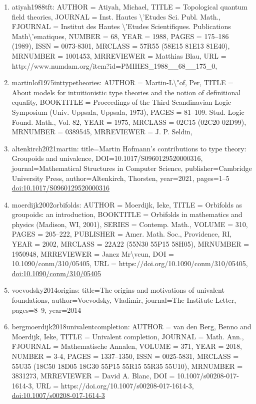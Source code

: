 \documentclass[11pt]{article}
\begin{document}
\begin{enumerate}[leftmargin=*]
  \item atiyah1988tft: AUTHOR = Atiyah, Michael, TITLE = Topological quantum field theories, JOURNAL = Inst. Hautes \textbackslash{}'Etudes Sci. Publ. Math., FJOURNAL = Institut des Hautes \textbackslash{}'Etudes Scientifiques. Publications Math\textbackslash{}'ematiques, NUMBER = 68, YEAR = 1988, PAGES = 175--186 (1989), ISSN = 0073-8301, MRCLASS = 57R55 (58E15 81E13 81E40), MRNUMBER = 1001453, MRREVIEWER = Matthias Blau, URL = http://www.numdam.org/item?id=PMIHES\_1988\_\_68\_\_175\_0,
  \item martinlof1975inttypetheories: AUTHOR = Martin-L\textbackslash{}"of, Per, TITLE = About models for intuitionistic type theories and the notion of definitional equality, BOOKTITLE = Proceedings of the Third Scandinavian Logic Symposium (Univ. Uppsala, Uppsala, 1973), PAGES = 81--109. Stud. Logic Found. Math., Vol. 82, YEAR = 1975, MRCLASS = 02C15 (02C20 02D99), MRNUMBER = 0389545, MRREVIEWER = J. P. Seldin,
  \item altenkirch2021martin: title=Martin Hofmann’s contributions to type theory: Groupoids and univalence, DOI=10.1017/S0960129520000316, journal=Mathematical Structures in Computer Science, publisher=Cambridge University Press, author=Altenkirch, Thorsten, year=2021, pages=1--5 \href{https://doi.org/10.1017/S0960129520000316}{doi:10.1017/S0960129520000316}
  \item moerdijk2002orbifolds: AUTHOR = Moerdijk, Ieke, TITLE = Orbifolds as groupoids: an introduction, BOOKTITLE = Orbifolds in mathematics and physics (Madison, WI, 2001), SERIES = Contemp. Math., VOLUME = 310, PAGES = 205--222, PUBLISHER = Amer. Math. Soc., Providence, RI, YEAR = 2002, MRCLASS = 22A22 (55N30 55P15 58H05), MRNUMBER = 1950948, MRREVIEWER = Janez Mr\textbackslash{}vcun, DOI = 10.1090/conm/310/05405, URL = https://doi.org/10.1090/conm/310/05405, \href{https://doi.org/10.1090/conm/310/05405}{doi:10.1090/conm/310/05405}
  \item voevodsky2014origins: title=The origins and motivations of univalent foundations, author=Voevodsky, Vladimir, journal=The Institute Letter, pages=8--9, year=2014
  \item bergmoerdijk2018univalentcompletion: AUTHOR = van den Berg, Benno and Moerdijk, Ieke, TITLE = Univalent completion, JOURNAL = Math. Ann., FJOURNAL = Mathematische Annalen, VOLUME = 371, YEAR = 2018, NUMBER = 3-4, PAGES = 1337--1350, ISSN = 0025-5831, MRCLASS = 55U35 (18C50 18D05 18G30 55P15 55R15 55R35 55U10), MRNUMBER = 3831273, MRREVIEWER = David A. Blanc, DOI = 10.1007/s00208-017-1614-3, URL = https://doi.org/10.1007/s00208-017-1614-3, \href{https://doi.org/10.1007/s00208-017-1614-3}{doi:10.1007/s00208-017-1614-3}

\end{enumerate}
\end{document}
